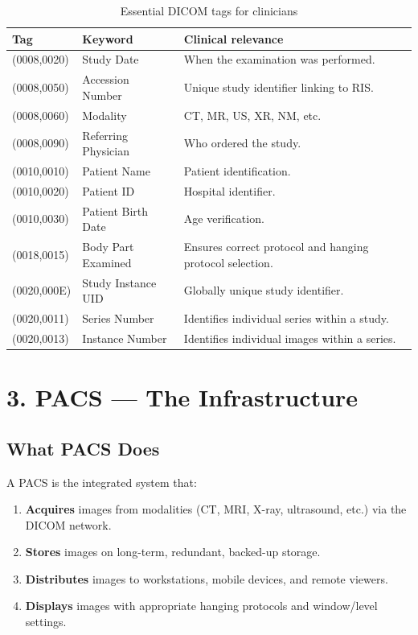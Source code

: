 \begin{table}[h]
\centering
\caption{Essential DICOM tags for clinicians}
\begin{tabular}{|l|l|p{5cm}|}
\hline
\textbf{Tag} & \textbf{Keyword} & \textbf{Clinical relevance} \\
\hline
(0008,0020) & Study Date & When the examination was performed. \\
\hline
(0008,0050) & Accession Number & Unique study identifier linking to RIS. \\
\hline
(0008,0060) & Modality & CT, MR, US, XR, NM, etc. \\
\hline
(0008,0090) & Referring Physician & Who ordered the study. \\
\hline
(0010,0010) & Patient Name & Patient identification. \\
\hline
(0010,0020) & Patient ID & Hospital identifier. \\
\hline
(0010,0030) & Patient Birth Date & Age verification. \\
\hline
(0018,0015) & Body Part Examined & Ensures correct protocol and hanging protocol selection. \\
\hline
(0020,000E) & Study Instance UID & Globally unique study identifier. \\
\hline
(0020,0011) & Series Number & Identifies individual series within a study. \\
\hline
(0020,0013) & Instance Number & Identifies individual images within a series. \\
\hline
\end{tabular}
\end{table}


\section*{3. PACS --- The Infrastructure}

\subsection*{What PACS Does}
A PACS is the integrated system that:
\begin{enumerate}
    \item \textbf{Acquires} images from modalities (CT, MRI, X-ray, ultrasound, etc.) via the DICOM network.
    \item \textbf{Stores} images on long-term, redundant, backed-up storage.
    \item \textbf{Distributes} images to workstations, mobile devices, and remote viewers.
    \item \textbf{Displays} images with appropriate hanging protocols and window/level settings.
\end{enumerate}

